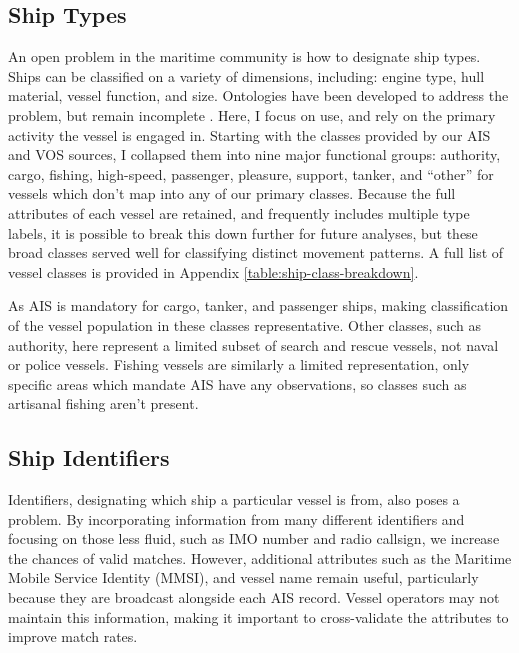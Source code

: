 \subsection{Ship Types}


An open problem in the maritime community is how to designate ship types. Ships can be classified on a variety of dimensions, including: engine type, hull material, vessel function, and size. Ontologies have been developed to address the problem, but remain incomplete \citep{Vries2009}. Here, I focus on use, and rely on the primary activity the vessel is engaged in. Starting with the classes provided by our AIS and VOS sources, I collapsed them into nine major functional groups: authority, cargo, fishing, high-speed, passenger, pleasure, support, tanker, and ``other'' for vessels which don't map into any of our primary classes. Because the full attributes of each vessel are retained, and frequently includes multiple type labels, it is possible to break this down further for future analyses, but these broad classes served well for classifying distinct movement patterns. A full list of vessel classes is provided in Appendix \ref{table:ship-class-breakdown}.

As AIS is mandatory for cargo, tanker, and passenger ships, making classification of the vessel population in these classes representative. Other classes, such as authority, here represent a limited subset of search and rescue vessels, not naval or police vessels. Fishing vessels are similarly a limited representation, only specific areas which mandate AIS have any observations, so classes such as artisanal fishing aren't present.

\subsection{Ship Identifiers} 

Identifiers, designating which ship a particular vessel is from, also poses a problem. By incorporating information from many different identifiers and focusing on those less fluid, such as IMO number and radio callsign, we increase the chances of valid matches. However, additional attributes such as the Maritime Mobile Service Identity (MMSI), and vessel name remain useful, particularly because they are broadcast alongside each AIS record. Vessel operators may not maintain this information, making it important to cross-validate the attributes to improve match rates.

